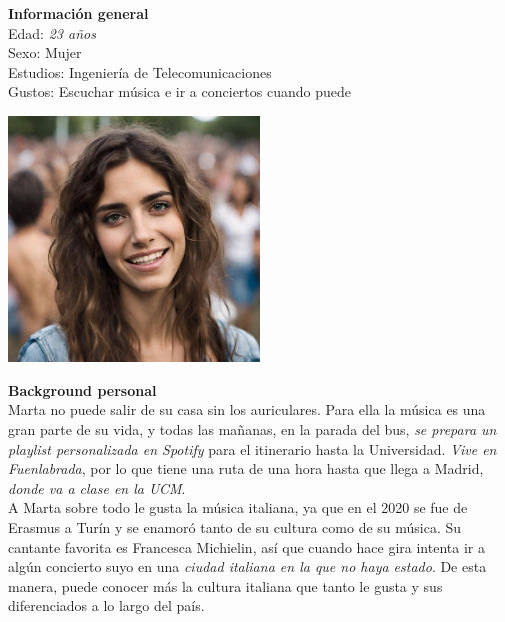 \begin{minipage}{0.4\textwidth}
    \textbf{Información general} \\

    Edad: \textit{23 años} \\
    Sexo: Mujer \\
    Estudios: Ingeniería de Telecomunicaciones \\
    Gustos: Escuchar música e ir a conciertos cuando puede \\
\end{minipage}
\hfill
\begin{minipage}{0.4\textwidth}
    \centering
    \includegraphics[width=0.5\textwidth]{Imagenes/Personas/Marta.jpg}
    \label{fig:fotoMarta}
\end{minipage}

\textbf{Background personal} \\

Marta no puede salir de su casa sin los auriculares. Para ella la música es una gran parte
de su vida, y todas las mañanas, en la parada del bus, \textit{se prepara un playlist personalizada
en Spotify} para el itinerario hasta la Universidad. \textit{Vive en Fuenlabrada}, por lo que tiene
una ruta de una hora hasta que llega a Madrid, \textit{donde va a clase en la UCM}. \\ 

A Marta sobre todo le gusta la música italiana, ya que en el 2020 se fue de Erasmus a Turín y se
enamoró tanto de su cultura como de su música. Su cantante favorita es Francesca Michielin, así que
cuando hace gira intenta ir a algún concierto suyo en una \textit{ciudad italiana en la que no haya
estado}. De esta manera, puede conocer más la cultura italiana que tanto le gusta y sus diferenciados
a lo largo del país. \\

